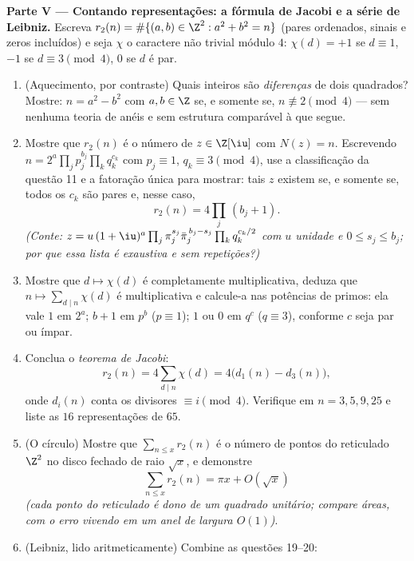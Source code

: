 \begin{problem}
\medskip
\noindent\textbf{Parte V --- Contando representações: a fórmula de
Jacobi e a série de Leibniz.} Escreva $r_2(n) = \#\{(a, b) \in
\Z^2 : a^2 + b^2 = n\}$ (pares ordenados, sinais e
zeros incluídos) e seja $\chi$ o caractere não trivial módulo
$4$: $\chi(d) = +1$ se $d \equiv 1$, $-1$ se $d \equiv 3 \pmod4$, $0$ se $d$ é par.
\begin{enumerate}[resume]
  \item (Aquecimento, por contraste) Quais inteiros são
        \emph{diferenças} de dois quadrados? Mostre: $n = a^2 - b^2$ com $a, b \in \Z$ se,
        e somente se, $n \not\equiv 2 \pmod 4$ --- sem nenhuma teoria de anéis e sem
        estrutura comparável à que segue.
  \item Mostre que $r_2(n)$ é o número de $z \in \Z[\iu]$ com $N(z) = n$.
        Escrevendo $n = 2^{a}\prod_jp_j^{b_j}
        \prod_kq_k^{c_k}$ com $p_j \equiv 1$, $q_k \equiv 3
        \pmod4$, use a classificação da
        questão 11 e a fatoração única para mostrar: tais $z$
        existem se, e somente se, todos os $c_k$ são pares e, nesse
        caso,
        \[
        r_2(n) = 4\prod_j\,(b_j + 1) .
        \]
        \emph{(Conte: $z = u\,(1+\iu)^{a}\prod_j\pi_j^{s_j}
        \bar\pi_j^{\,b_j - s_j}\prod_kq_k^{c_k/2}$ com $u$ unidade e $0 \leq s_j \leq b_j$; por que essa
        lista é exaustiva e sem repetições?)}
  \item Mostre que $d \mapsto \chi(d)$ é completamente multiplicativa, deduza que
        $n \mapsto
        \sum_{d \mid n}\chi(d)$ é multiplicativa e calcule-a nas potências de primos: ela
        vale $1$ em $2^a$; $b + 1$ em $p^b$ ($p \equiv 1$);
        $1$ ou $0$ em $q^c$ ($q \equiv 3$), conforme $c$ seja
        par ou ímpar.
  \item Conclua o \emph{teorema de Jacobi}:
        \[
        r_2(n) = 4\sum_{d \mid n}\chi(d) =
        4\bigl(d_1(n) - d_3(n)\bigr),
        \]
        onde $d_i(n)$ conta os divisores $\equiv i \pmod 4$. Verifique em $n = 3, 5, 9, 25$ e
        liste as $16$ representações de $65$.
  \item (O círculo) Mostre que $\sum_{n \leq x}r_2(n)$ é o número de pontos do reticulado
        $\Z^2$ no disco fechado de raio $\sqrt x$, e demonstre
        \[
        \sum_{n\leq x}r_2(n) = \pi x + O(\sqrt x)
        \]
        \emph{(cada ponto do reticulado é dono de um quadrado unitário;
        compare áreas, com o erro vivendo em um anel de largura
        $O(1)$)}.
  \item (Leibniz, lido aritmeticamente) Combine as questões 19--20:

\end{enumerate}
\end{problem}
